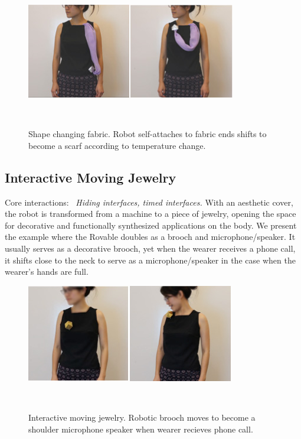 \begin{figure}[!t]
\centering
  \includegraphics[width=1\columnwidth]{pictures/chapter4/scarf.jpg}
  \caption{Shape changing fabric. Robot self-attaches to fabric ends shifts to become a scarf according to temperature change.}~\label{fig:scarf}
\end{figure}

\subsection{Interactive Moving Jewelry}
Core interactions: ~\textit{Hiding interfaces, timed interfaces.}
With an aesthetic cover, the robot is transformed from a machine to a piece of jewelry, opening the space for decorative and functionally synthesized applications on the body. We present the example where the Rovable doubles as a brooch and microphone/speaker. It usually serves as a decorative brooch, yet when the wearer receives a phone call,  it shifts close to the neck to serve as a microphone/speaker in the case when the wearer's hands are full. 

\begin{figure}[h]
\centering
  \includegraphics[width=1\columnwidth]{pictures/chapter4/speaker.jpg}
  \caption{Interactive moving jewelry. Robotic brooch moves to become a shoulder microphone speaker when wearer recieves phone call. }~\label{fig:speaker}
\end{figure}

